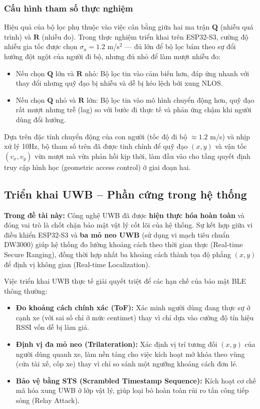 \subsubsection{Cấu hình tham số thực nghiệm}

Hiệu quả của bộ lọc phụ thuộc vào việc cân bằng giữa hai ma trận $\mathbf{Q}$ (nhiễu quá trình) và $\mathbf{R}$ (nhiễu đo). Trong thực nghiệm triển khai trên ESP32-S3, cường độ nhiễu gia tốc được chọn $\sigma_a = 1.2$ m/s$^2$ --- đủ lớn để bộ lọc bám theo sự đổi hướng đột ngột của người đi bộ, nhưng đủ nhỏ để làm mượt nhiễu đo:
\begin{itemize}
    \item Nếu chọn $\mathbf{Q}$ lớn và $\mathbf{R}$ nhỏ: Bộ lọc tin vào cảm biến hơn, đáp ứng nhanh với thay đổi nhưng quỹ đạo bị nhiễu và dễ bị kéo lệch bởi xung NLOS.
    \item Nếu chọn $\mathbf{Q}$ nhỏ và $\mathbf{R}$ lớn: Bộ lọc tin vào mô hình chuyển động hơn, quỹ đạo rất mượt nhưng trễ (lag) so với bước đi thực tế và phản ứng chậm khi người dùng đổi hướng.
\end{itemize}

Dựa trên đặc tính chuyển động của con người (tốc độ đi bộ $\approx 1.2$ m/s) và nhịp xử lý 10Hz, bộ tham số trên đã được tinh chỉnh để quỹ đạo $(x, y)$ và vận tốc $(v_x, v_y)$ vừa mượt mà vừa phản hồi kịp thời, làm đầu vào cho tầng quyết định truy cập hình học (geometric access control) ở giai đoạn hai.



\subsection{Triển khai UWB – Phần cứng trong hệ thống}

\textbf{Trong đề tài này:} Công nghệ UWB đã được \textbf{hiện thực hóa hoàn toàn} và đóng vai trò là chốt chặn bảo mật vật lý cốt lõi của hệ thống. Sự kết hợp giữa vi điều khiển ESP32-S3 và \textbf{ba mỏ neo UWB} (sử dụng vi mạch tiêu chuẩn DW3000) giúp hệ thống đo lường khoảng cách theo thời gian thực (Real-time Secure Ranging), đồng thời hợp nhất ba khoảng cách thành tọa độ phẳng $(x, y)$ để định vị không gian (Real-time Localization).

Việc triển khai UWB thực tế giải quyết triệt để các hạn chế của bảo mật BLE thông thường:
\begin{itemize}
    \item \textbf{Đo khoảng cách chính xác (ToF):} Xác minh người dùng đang thực sự ở cạnh xe (với sai số chỉ ở mức centimet) thay vì chỉ dựa vào cường độ tín hiệu RSSI vốn dễ bị làm giả.
    \item \textbf{Định vị đa mỏ neo (Trilateration):} Xác định vị trí tương đối $(x, y)$ của người dùng quanh xe, làm nền tảng cho việc kích hoạt mở khóa theo vùng (cửa tài xế, cốp xe) thay vì chỉ so sánh một ngưỡng khoảng cách đơn lẻ.
    \item \textbf{Bảo vệ bằng STS (Scrambled Timestamp Sequence):} Kích hoạt cơ chế mã hóa xung UWB ở lớp vật lý, giúp loại bỏ hoàn toàn rủi ro tấn công tiếp sóng (Relay Attack).
\end{itemize}

